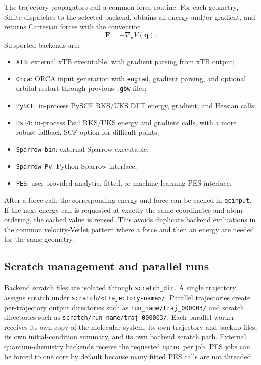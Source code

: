 \documentclass[11pt]{article}
\begin{document}
The trajectory propagators call a common force routine.  For each geometry, Smite dispatches to the selected backend, obtains an energy and/or gradient, and returns Cartesian forces with the convention
\begin{equation}
  \mathbf{F} = -\nabla_{\mathbf{q}} V(\mathbf{q}).
\end{equation}
Supported backends are:
\begin{itemize}
  \item \texttt{XTB}: external xTB executable, with gradient parsing from xTB output;
  \item \texttt{Orca}: ORCA input generation with \texttt{engrad}, gradient parsing, and optional orbital restart through previous \texttt{.gbw} files;
  \item \texttt{PySCF}: in-process PySCF RKS/UKS DFT energy, gradient, and Hessian calls;
  \item \texttt{Psi4}: in-process Psi4 RKS/UKS energy and gradient calls, with a more robust fallback SCF option for difficult points;
  \item \texttt{Sparrow\_bin}: external Sparrow executable;
  \item \texttt{Sparrow\_Py}: Python Sparrow interface;
  \item \texttt{PES}: user-provided analytic, fitted, or machine-learning PES interface.
\end{itemize}

After a force call, the corresponding energy and force can be cached in \texttt{qcinput}.  If the next energy call is requested at exactly the same coordinates and atom ordering, the cached value is reused.  This avoids duplicate backend evaluations in the common velocity-Verlet pattern where a force and then an energy are needed for the same geometry.

\subsection{Scratch management and parallel runs}

Backend scratch files are isolated through \texttt{scratch\_dir}.  A single trajectory assigns scratch under \texttt{scratch/<trajectory-name>/}.  Parallel trajectories create per-trajectory output directories such as \texttt{run\_name/traj\_000003/} and scratch directories such as \texttt{scratch/run\_name/traj\_000003/}.  Each parallel worker receives its own copy of the molecular system, its own trajectory and backup files, its own initial-condition summary, and its own backend scratch path.  External quantum-chemistry backends receive the requested \texttt{nproc} per job.  PES jobs can be forced to one core by default because many fitted PES calls are not threaded.
\end{document}
